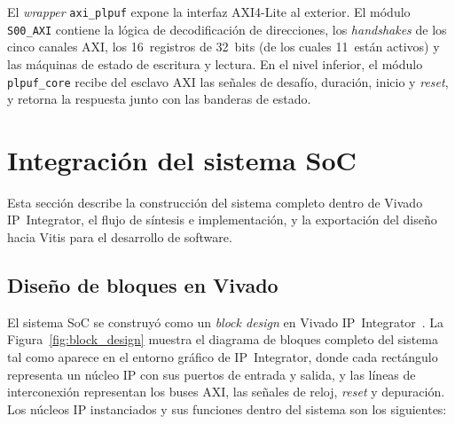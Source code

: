El \textit{wrapper} \texttt{axi\_plpuf} expone la interfaz AXI4-Lite al
exterior. El módulo \texttt{S00\_AXI} contiene la lógica de decodificación
de direcciones, los \textit{handshakes} de los cinco canales AXI, los
16~registros de 32~bits (de los cuales 11~están activos) y las máquinas de
estado de escritura y lectura. En el nivel inferior, el módulo
\texttt{plpuf\_core} recibe del esclavo AXI las señales de desafío, duración,
inicio y \textit{reset}, y retorna la respuesta junto con las banderas de
estado.

\section{Integración del sistema SoC}
\label{sec:integracion}

Esta sección describe la construcción del sistema completo dentro de Vivado
IP~Integrator, el flujo de síntesis e implementación, y la exportación del
diseño hacia Vitis para el desarrollo de software.

\subsection{Diseño de bloques en Vivado}
\label{sec:block_design}

El sistema SoC se construyó como un \textit{block design} en Vivado
IP~Integrator~\cite{ug994}. La Figura~\ref{fig:block_design} muestra el
diagrama de bloques completo del sistema tal como aparece en el entorno
gráfico de IP~Integrator, donde cada rectángulo representa un núcleo IP con
sus puertos de entrada y salida, y las líneas de interconexión representan
los buses AXI, las señales de reloj, \textit{reset} y depuración. Los
núcleos IP instanciados y sus funciones dentro del sistema son los
siguientes:

